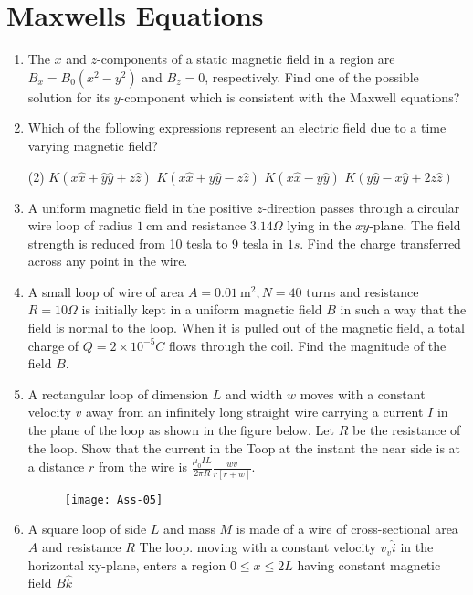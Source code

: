 \chapter{Maxwells Equations}
\begin{enumerate}
	\item 	The $x$ and $z$-components of a static magnetic field in a region are $B_{x}=B_{0}\left(x^{2}-y^{2}\right)$ and $B_{z}=0$, respectively. Find one of the possible solution for its $y$-component which is consistent with the Maxwell equations?
	\item 	Which of the following expressions represent an electric field due to a time varying magnetic field?
	 \begin{tasks}(2)
		\task[\textbf{a.}]$K(x \hat{x}+\hat{y} \hat{y}+z \hat{z})$
		\task[\textbf{b.}]$K(x \hat{x}+y \hat{y}-z \hat{z})$
		\task[\textbf{c.}] $K(x \hat{x}-y \hat{y})$
		\task[\textbf{d.}] $K(y \hat{y}-x \hat{y}+2 z \hat{z})$
	\end{tasks}
	\item A uniform magnetic field in the positive $z$-direction passes through a circular wire loop of radius $1 \mathrm{~cm}$ and resistance $3.14 \Omega$ lying in the $x y$-plane. The field strength is reduced from 10 tesla to 9 tesla in $1 s$. Find the charge transferred across any point in the wire. 
	\item A small loop of wire of area $A=0.01 \mathrm{~m}^{2}, N=40$ turns and resistance $R=10 \Omega$ is initially kept in a uniform magnetic field $B$ in such a way that the field is normal to the loop. When it is pulled out of the magnetic field, a total charge of $Q=2 \times 10^{-5} C$ flows through the coil. Find the magnitude of the field $B$.
	\item A rectangular loop of dimension $L$ and width $w$ moves with a constant velocity $v$ away from an infinitely long straight wire carrying a current $I$ in the plane of the loop as shown in the figure below. Let $R$ be the resistance of the loop. Show that the current in the Toop at the instant the near side is at a distance $r$ from the wire is $\frac{\mu_{0} I L}{2 \pi R} \frac{w v}{r[r+w]}$.
	\begin{figure}[H]
		\centering
		\texttt{[image: Ass-05]}
	\end{figure}
\item A square loop of side $L$ and mass $M$ is made of a wire of cross-sectional area $A$ and resistance $R$ The loop. moving with a constant velocity $v_{v} \hat{i}$ in the horizontal xy-plane, enters a region $0 \leq x \leq 2 L$ having constant magnetic field $B \hat{k}$

\end{enumerate}
